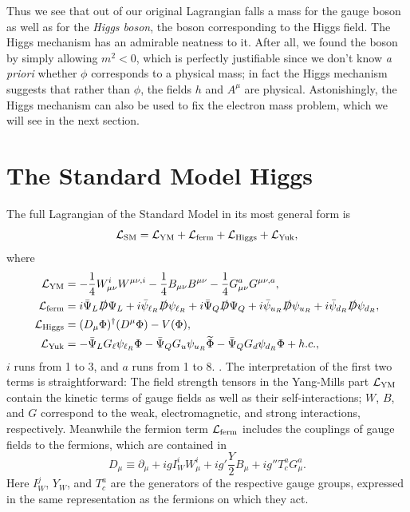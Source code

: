 Thus we see that out of our original Lagrangian falls a mass for the gauge
boson as well as for the {\it Higgs boson}, the boson corresponding to the
Higgs field. The Higgs mechanism has an admirable neatness to it. After all,
we found the boson by simply allowing $m^2<0$, which is perfectly justifiable
since we don't know {\it a priori} whether $\phi$ corresponds to a physical 
mass; in fact the Higgs mechanism suggests that rather than $\phi$, the
fields $h$ and $A^{\mu}$ are physical. Astonishingly, the Higgs mechanism
can also be used to fix the electron mass problem, which we will see in the
next section.

\section{The Standard Model Higgs}
The full Lagrangian of the Standard Model in its most general form is
\begin{equation}
  \label{eq:LSM}
  \mathcal{L}_{\rm SM}=\mathcal{L}_{\rm YM}+\mathcal{L}_{\rm ferm}+\mathcal{L}_{\rm Higgs}
                               +\mathcal{L}_{\rm Yuk},
\end{equation}
where
\begin{equation}
  \label{eq:Ldefs}
  \begin{aligned}
    \mathcal{L}_{\rm YM}&=-\frac{1}{4}W_{\mu\nu}^iW^{\mu\nu,i}
                -\frac{1}{4}B_{\mu\nu}B^{\mu\nu}
                -\frac{1}{4}G_{\mu\nu}^aG^{\mu\nu,a}, \\
    \mathcal{L}_{\rm ferm}&= i\bar{\Psi}_{L}\slashed{D}\Psi_{L}
                  +i\bar{\psi}_{\ell_R}\slashed{D}\psi_{\ell_R}
                  +i\bar{\Psi}_{Q}\slashed{D}\Psi_{Q}
                  +i\bar{\psi}_{u_R}\slashed{D}\psi_{u_R}
                  +i\bar{\psi}_{d_R}\slashed{D}\psi_{d_R}, \\
    \mathcal{L}_{\rm Higgs}&=(D_{\mu}\Phi)^{\dagger}(D^{\mu}\Phi)-V(\Phi), \\
    \mathcal{L}_{\rm Yuk}&=-\bar{\Psi}_{L}G_{\ell}\psi_{\ell_R}\Phi
                 -\bar{\Psi}_{Q}G_{u}\psi_{u_R}\widetilde{\Phi}
                 -\bar{\Psi}_{Q}G_{d}\psi_{d_R}\Phi+h.c.,
  \end{aligned}
\end{equation}
$i$ runs from 1 to 3, and $a$ runs from 1 to 8. \cite{dittmaier_higgs_2013}. 
The interpretation 
of the first two terms is straightforward: The field strength 
tensors in the Yang-Mills part $\mathcal{L}_{\rm YM}$ contain the 
kinetic terms of gauge 
fields as well as their self-interactions; $W$, $B$, and $G$ correspond to the 
weak, electromagnetic, and strong interactions, respectively. Meanwhile the 
fermion term $\mathcal{L}_{\rm ferm}$ includes the couplings of gauge fields to the 
fermions, which are contained in
\begin{equation}
  D_{\mu}\equiv\partial_{\mu}+igI_{W}^{i}W_{\mu}^{i}
                  +ig'\frac{Y}{2}B_{\mu}+ig''T_{c}^{a}G_{\mu}^{a}.
\end{equation}
Here $I_{W}^{j}$, $Y_{W}$, and $T_c^{a}$ are the generators of the respective 
gauge groups, expressed in the same representation as the fermions on which 
they act.

